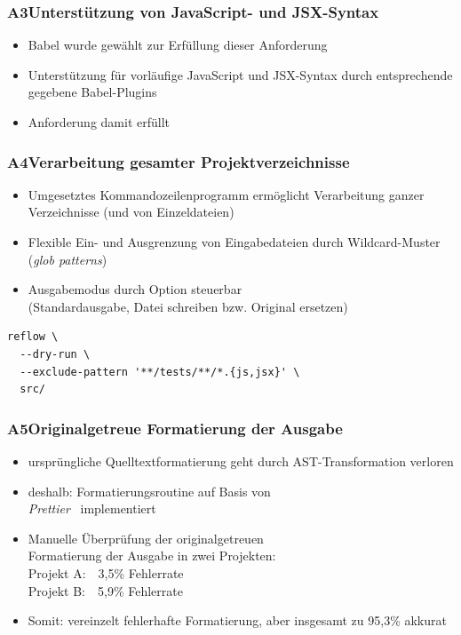       \begin{frame}
        \frametitle{A3\hspace{0.75em}Unterstützung von JavaScript- und JSX-Syntax}
        \begin{itemize}
          \item Babel wurde gewählt zur Erfüllung dieser Anforderung
          \item Unterstützung für vorläufige JavaScript und JSX-Syntax durch entsprechende gegebene Babel-Plugins
          \item Anforderung damit erfüllt
        \end{itemize}
      \end{frame}

      \begin{frame}[fragile]
        \frametitle{A4\hspace{0.75em}Verarbeitung gesamter Projektverzeichnisse}
        \begin{itemize}
          \item Umgesetztes Kommandozeilenprogramm ermöglicht Verarbeitung ganzer Verzeichnisse (und von Einzeldateien)
          \item Flexible Ein- und Ausgrenzung von Eingabedateien durch Wildcard-Muster (\textit{glob patterns})
          \item Ausgabemodus durch Option steuerbar\\(Standardausgabe, Datei schreiben bzw. Original ersetzen)
        \end{itemize}

        \bigskip
        \begin{lstlisting}[numbers=none]
reflow \
  --dry-run \
  --exclude-pattern '**/tests/**/*.{js,jsx}' \
  src/
        \end{lstlisting}
      \end{frame}

      \begin{frame}
        \frametitle{A5\hspace{0.75em}Originalgetreue Formatierung der Ausgabe}
        \begin{itemize}
          \item ursprüngliche Quelltextformatierung geht durch AST-Transformation verloren
          \item deshalb: Formatierungsroutine auf Basis von\\\textit{Prettier}~\autocite{SOFTWARE:PRETTIER} implementiert
          \item Manuelle Überprüfung der originalgetreuen\\Formatierung der Ausgabe in zwei Projekten:\\
            \medskip
            \hspace{1em}Projekt A:~~3,5\% Fehlerrate\\
            \smallskip
            \hspace{1em}Projekt B:~~5,9\% Fehlerrate
          \item Somit: vereinzelt fehlerhafte Formatierung, aber insgesamt zu 95,3\% akkurat
        \end{itemize}
      \end{frame}

